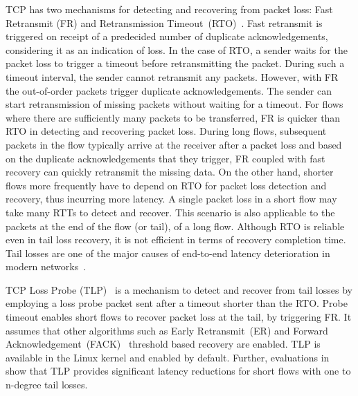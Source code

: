 \documentclass[10pt,conference]{IEEEtran}
\begin{document}
TCP has two mechanisms for detecting and recovering from packet loss: Fast Retransmit (FR) and Retransmission Timeout~(RTO)~\cite{Flach:2013}. 
Fast retransmit is triggered on receipt of a predecided number of duplicate acknowledgements, considering it as an indication of loss. In the case 
of RTO, a sender waits for the packet loss to trigger a timeout before retransmitting the packet. During such a timeout interval, 
the sender cannot retransmit any 
packets. However, with FR the out-of-order packets trigger duplicate acknowledgements. The sender can start retransmission of missing packets 
without waiting for a timeout. For flows where there are sufficiently many packets to be transferred, FR is quicker than RTO in detecting and 
recovering packet loss. During long flows, subsequent packets in the flow typically arrive at the receiver after a packet loss and based
on the duplicate acknowledgements that they trigger, FR coupled with fast recovery can quickly retransmit the missing data. 
On the other hand, shorter flows more frequently have to depend on RTO for packet loss detection and recovery, thus incurring more latency. A single 
packet loss in a short flow may take many RTTs to detect and recover. This scenario is also applicable to the packets at the end of the flow 
(or tail), of a long flow. Although RTO is reliable even in tail loss recovery, it is not efficient in terms of recovery completion time. Tail 
losses are one of the major causes of end-to-end latency deterioration in modern networks~\cite{Flach:2013}. 


TCP Loss Probe (TLP)~\cite{Flach:2013} is a mechanism to detect and recover from tail losses by employing a loss probe packet sent after a timeout shorter
than the RTO. Probe timeout enables short flows to recover packet loss at the tail, by triggering FR. It assumes that other algorithms such as 
Early Retransmit~(ER)\cite{rfc5827} and Forward Acknowledgement~(FACK)~\cite{FACK} threshold based recovery are enabled. TLP is available in the Linux 
kernel and enabled by default. Further, evaluations in~\cite{Rajiullah:2015} show that TLP provides significant latency reductions for short 
flows with one to n-degree tail losses. 
\end{document}
